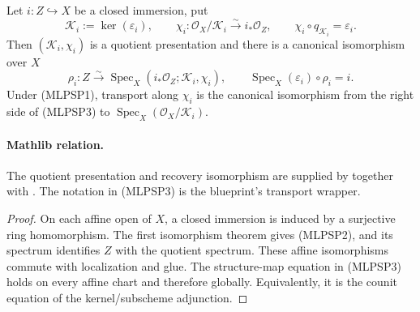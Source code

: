 \begin{lemma}
  \label{lemma:nagata-closed-immersion-relative-spec-recovery}

  Let $i\colon Z\hookrightarrow X$ be a closed immersion, put
  \[
    \mathcal K_i:=\ker(\varepsilon_i),
    \qquad
    \chi_i\colon
      \mathcal O_X/\mathcal K_i\xrightarrow{\sim}i_*\mathcal O_Z,
    \qquad
    \chi_i\circ q_{\mathcal K_i}=\varepsilon_i.                 \tag{MLPSP2}
  \]
  Then $(\mathcal K_i,\chi_i)$ is a quotient presentation and there is a
  canonical isomorphism over $X$
  \[
    \rho_i\colon Z\xrightarrow{\sim}
      \operatorname{Spec}_X
        (i_*\mathcal O_Z;\mathcal K_i,\chi_i),
    \qquad
    \operatorname{Spec}_X(\varepsilon_i)\circ\rho_i=i.          \tag{MLPSP3}
  \]
  Under (MLPSP1), transport along $\chi_i$ is the canonical isomorphism from
  the right side of (MLPSP3) to
  $\operatorname{Spec}_X(\mathcal O_X/\mathcal K_i)$.

  \paragraph{Mathlib relation.}
  The quotient presentation and recovery isomorphism are supplied by
  \texttt{}
  together with \texttt{}.
  The notation in (MLPSP3) is the blueprint's transport wrapper.
\end{lemma}

\begin{proof}
  On each affine open of $X$, a closed immersion is induced by a surjective
  ring homomorphism.  The first isomorphism theorem gives (MLPSP2), and its
  spectrum identifies $Z$ with the quotient spectrum.  These affine
  isomorphisms commute with localization and glue.  The structure-map
  equation in (MLPSP3) holds on every affine chart and therefore globally.
  Equivalently, it is the counit equation of the kernel/subscheme
  adjunction.
\end{proof}


